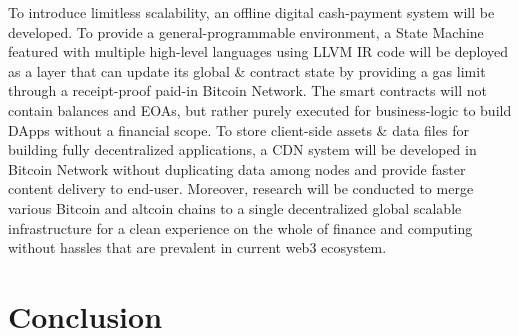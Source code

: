 \documentclass[a4paper,10pt]{article}
\begin{document}
To introduce limitless scalability, an offline digital cash-payment system will be developed. To provide a general-programmable environment, a State Machine featured with multiple high-level languages using LLVM \cite{llvm} IR code will be deployed as a layer that can update its global \& contract state by providing a gas limit through a receipt-proof paid-in Bitcoin Network. The smart contracts will not contain balances and EOAs, but rather purely executed for business-logic to build DApps without a financial scope. To store client-side assets \& data files for building fully decentralized applications, a CDN system will be developed in Bitcoin Network without duplicating data among nodes and provide faster content delivery to end-user. Moreover, research will be conducted to merge various Bitcoin and altcoin chains to a single decentralized global scalable infrastructure for a clean experience on the whole of finance and computing without hassles that are prevalent in current web3 ecosystem.

\section{Conclusion}

\blindtext
\blindtext


\end{document}
